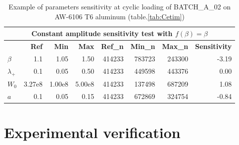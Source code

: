 \documentclass[3p,times,procedia,number]{elsarticle}
\begin{document}
\begin{table}[!h]
	\centering
	\begin{tabular}{lrrrrrrr}
		\hline
		\multicolumn{8}{c}{\textbf{Constant amplitude sensitivity test with $f(\beta)=\beta$}}                                                                                                                                                                                                                                           \\ \hline
		& \multicolumn{1}{r}{\textbf{Ref}} & \multicolumn{1}{r}{\textbf{Min}} & \multicolumn{1}{r}{\textbf{Max}} & \multicolumn{1}{r}{\textbf{Ref\_n}} & \multicolumn{1}{r}{\textbf{Min\_n}} & \multicolumn{1}{r}{\textbf{Max\_n}} & \multicolumn{1}{r}{\textbf{Sensitivity}} \\ \hline
		\textbf{$\beta$}   & 1.1                                          & 1.05                             & 1.50                             & 414233                                     & 
		783723 	                              & 243300 
		&-3.19 
		\\
		\textbf{$\lambda_+$} & 0.1                                          & 0.05                             & 0.50                             & 414233                                    & 449598 
		& 443376 
		& 0.00                                    \\
		\textbf{$W_0$}     & 3.27e8                                     & 1.00e8                         & 5.00e8                         & 414233                                     & 137498 
		& 687209 
		& 1.08                                    \\
		\textbf{$a$}       & 0.1                                          & 0.05                             & 0.15                             & 414233                                  & 672869 
		& 324754 
		& -0.84                                   \\ \hline
	\end{tabular}
	\caption{Example of parameters sensitivity at cyclic loading of BATCH\_A\_02 on AW-6106 T6 aluminum (table.\ref{tab:Cetim})}
	\label{tab.sensitivity_const1}
\end{table}

\clearpage

\section{Experimental verification}
\end{document}
